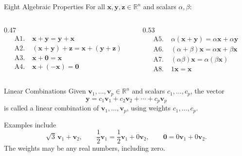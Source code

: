 \begin{frame}{Eight Algebraic Properties}
  For all $\mathbf{x},\mathbf{y},\mathbf{z}\in\mathbb{R}^n$ and scalars
  $\alpha,\beta$:
  \begin{columns}[T]
    \begin{column}{0.47\textwidth}
      \begin{align*}
        \mathrm{A1}.\;&\mathbf{x}+\mathbf{y}=\mathbf{y}+\mathbf{x}\\
        \mathrm{A2}.\;&(\mathbf{x}+\mathbf{y})+\mathbf{z}
          =\mathbf{x}+(\mathbf{y}+\mathbf{z})\\
        \mathrm{A3}.\;&\mathbf{x}+\mathbf{0}=\mathbf{x}\\
        \mathrm{A4}.\;&\mathbf{x}+(-\mathbf{x})=\mathbf{0}
      \end{align*}
    \end{column}
    \begin{column}{0.53\textwidth}
      \begin{align*}
        \mathrm{A5}.\;&\alpha(\mathbf{x}+\mathbf{y})
          =\alpha\mathbf{x}+\alpha\mathbf{y}\\
        \mathrm{A6}.\;&(\alpha+\beta)\mathbf{x}
          =\alpha\mathbf{x}+\beta\mathbf{x}\\
        \mathrm{A7}.\;&(\alpha\beta)\mathbf{x}
          =\alpha(\beta\mathbf{x})\\
        \mathrm{A8}.\;&1\mathbf{x}=\mathbf{x}
      \end{align*}
    \end{column}
  \end{columns}
\end{frame}

\begin{frame}{Linear Combinations}
  Given $\mathbf{v}_1,\ldots,\mathbf{v}_p\in\mathbb{R}^n$ and scalars
  $c_1,\ldots,c_p$, the vector
  \[
    \mathbf{y}=c_1\mathbf{v}_1+c_2\mathbf{v}_2+\cdots+c_p\mathbf{v}_p
  \]
  is called a \alert{linear combination} of
  $\mathbf{v}_1,\ldots,\mathbf{v}_p$, using weights $c_1,\ldots,c_p$.

  Examples include
  \[
    \sqrt{3}\,\mathbf{v}_1+\mathbf{v}_2,\qquad
    \frac12\mathbf{v}_1=\frac12\mathbf{v}_1+0\mathbf{v}_2,\qquad
    \mathbf{0}=0\mathbf{v}_1+0\mathbf{v}_2.
  \]
  The weights may be any real numbers, including zero.
\end{frame}

